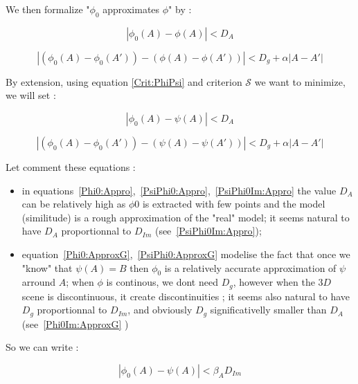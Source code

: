 We then formalize "$\phi_0$ approximates  $\phi$" by :


\begin{equation}
     | \phi_0(A)  - \phi(A) |  < D_A  \label{Phi0:Appro}
\end{equation}

\begin{equation}
     | (\phi_0(A) - \phi_0(A')) -(\phi(A) - \phi(A')) |  < D_g +  \alpha |A-A'|  \label{Phi0:ApproxG}
\end{equation}

By extension, using equation \ref{Crit:PhiPsi} and criterion $\mathcal S$ we want to minimize,
we will set :

\begin{equation}
     | \phi_0(A)  - \psi(A) |  < D_A  \label{PsiPhi0:Appro}
\end{equation}

\begin{equation}
     | (\phi_0(A) - \phi_0(A')) -(\psi(A) - \psi(A')) |  < D_g +  \alpha |A-A'|  \label{PsiPhi0:ApproxG}
\end{equation}



Let comment these equations  :

\begin{itemize}
   \item in equations~\ref{Phi0:Appro},~\ref{PsiPhi0:Appro},~\ref{PsiPhi0Im:Appro} the value 
         $D_A$ can be relatively high as $\phi0$
         is extracted with few points and the model (similitude) is a rough approximation
         of the "real" model; it seems natural to have $D_A$ proportionnal to  $D_{Im}$
        (see~\ref{PsiPhi0Im:Appro});

   \item equation~\ref{Phi0:ApproxG},~\ref{PsiPhi0:ApproxG} modelise the fact that once 
         we "know" that  $ \psi(A)=B$ then $\phi_0$ is a relatively accurate approximation
         of $\psi$ arround $A$;  when  $\phi$  is continous, we dont need $D_g$, however
         when the $3D$ scene is discontinuous, it create discontinuities ; 
         it seems also natural to have $D_g$ proportionnal to  $D_{Im}$, and obviously
         $D_g$ significativelly smaller than $D_A$ (see~\ref{Phi0Im:ApproxG} )
\end{itemize}

So we can write :


\begin{equation}
     | \phi_0(A)  - \psi(A) |  < \beta_A D_{Im}  \label{PsiPhi0Im:Appro}
\end{equation}

